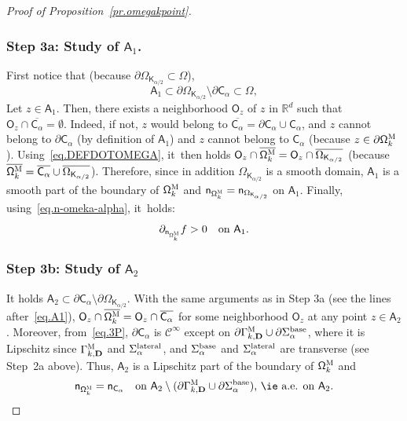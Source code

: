 \documentclass[10pt]{amsart}
\newcommand{\mbf}[1]{\mathbf{#1}}
\let\pa\partial
\theoremstyle{plain}
\theoremstyle{definition}
\begin{document}
\begin{proof}[Proof of Proposition~\ref{pr.omegakpoint}]
\subsubsection*{Step 3a: Study of $\mathsf A_1$. }
First notice that (because $\partial \Omega_{\mathsf K_{\alpha/2}}\subset \Omega$),
\begin{equation}\label{eq.A1}
\mathsf A_1\subset \partial \Omega_{\mathsf K_{\alpha/2}}\setminus \pa \mathsf C_\alpha \subset \Omega,
\end{equation}
Let $z\in\mathsf A_1$. Then, there exists a neighborhood $\mathsf O_z$ of $z$ in $\mathbb R^d$ such that $\mathsf O_z\cap \overline{\mathsf C_\alpha}=\emptyset$. Indeed, if not, $z$ would belong to $\overline{\mathsf C_\alpha}=\pa \mathsf C_{\alpha}\cup \mathsf C_{\alpha}$, and $z$ cannot belong to $\pa \mathsf C_{\alpha}$ (by definition of $\mathsf A_1$) and $z$ cannot belong to $ \mathsf C_{\alpha}$ (because $z\in \pa \mathsf \Omega_k^{\textsc{M}}$). Using~\eqref{eq.DEFDOTOMEGA}, it~then holds $\mathsf O_z\cap \overline{\mathsf \Omega_k^{\textsc{M}}}= \mathsf O_z \cap \overline{\Omega_{\mathsf K_{\alpha/2}}}$ (because $\overline{\mathsf \Omega_k^{\textsc{M}}}=\overline{\mathsf C_\alpha}\cup \overline{\Omega_{\mathsf K_{\alpha/2}}}$).
Therefore, since in addition $\Omega_{\mathsf K_{\alpha/2}}$ is a smooth domain, $\mathsf A_1$ is a smooth part of the boundary of $ \mathsf \Omega_k^{\textsc{M}}$ and $\mathsf n_{ \mathsf \Omega_k^{\textsc{M}}}=\mathsf n_{ \Omega_{\mathsf K_{\alpha/2}}}$ on $\mathsf A_1$.
Finally, using~\eqref{eq.n-omeka-alpha}, it~holds:
\begin{equation}\label{eq.panf1}
\partial_{ \mathsf n_{ \mathsf \Omega_k^{\textsc{M}}}} f>0 \quad\text{on }\mathsf A_1.
\end{equation}
\subsubsection*{Step 3b: Study of $\mathsf A_2$}
It holds $\mathsf A_2 \subset \pa \mathsf C_\alpha\setminus\partial \Omega_{\mathsf K_{\alpha/2}}$.
With the same arguments as in Step 3a (see the lines
after~\eqref{eq.A1}), $\mathsf O_z\cap \overline{\mathsf
\Omega_k^{\textsc{M}}}= \mathsf O_z \cap \overline{ \mathsf
C_\alpha}$ for some neighborhood $\mathsf O_z$ at any point $z \in \mathsf A_2$.
Moreover, from~\eqref{eq.3P}, $\pa \mathsf C_\alpha$ is
$\mathcal C^\infty$ except on $\pa{\Gamma_{k,\mbf D}^{\textsc{M}}
}\cup \pa \Sigma_\alpha^{\textup{base}}$, where it is Lipschitz since $\Gamma_{k,\mbf D}^{\textsc{M}}
$ and $\Sigma_\alpha^{\textup{lateral}}$, and $\Sigma_\alpha^{\textup{base}}$ and $\Sigma_\alpha^{\textup{lateral}}$ are transverse (see Step~2a above). Thus, $\mathsf A_2$ is a Lipschitz part of the boundary of $ \mathsf \Omega_k^{\textsc{M}}$ and
\begin{equation}\label{eq.nn=A2}
\mathsf n_{ \mathsf \Omega_k^{\textsc{M}}}=\mathsf n_{ \mathsf C_\alpha} \quad \text{on $\mathsf A_2\setminus (\pa{\Gamma_{k,\mbf D}^{\textsc{M}} }\cup \pa \Sigma_\alpha^{\textup{base}})$, \ie a.e. on $\mathsf A_2$}.
\end{equation}


\end{proof}
\end{document}
